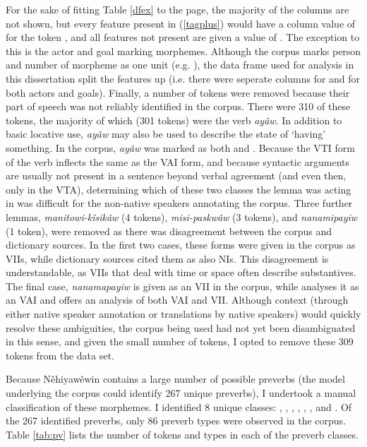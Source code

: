 For the sake of fitting Table \ref{dfex} to the page, the majority of the columns are not shown, but every feature present in (\ref{tagplus}) would have a column value of  for the token , and all features not present are given a value of . The exception to this is the actor and goal marking morphemes. Although the corpus marks person and number of morpheme as one unit (e.g. ), the data frame used for analysis in this dissertation split the features up (i.e. there were seperate columns for  and  for both actors and goals). Finally, a number of tokens were removed because their part of speech was not reliably identified in the corpus. There were 310 of these tokens, the majority of which (301 tokens) were the verb \textit{ayâw}. In addition to basic locative use, \textit{ayâw} may also be used to describe the state of `having' something. In the corpus, \textit{ayâw} was marked as both  and . Because the VTI form of the verb inflects the same as the VAI form, and because syntactic arguments are usually not present in a sentence beyond verbal agreement (and even then, only in the VTA), determining which of these two classes the lemma was acting in was difficult for the non-native speakers annotating the corpus. Three further lemmas, \textit{manitowi-kîsikâw} (4 tokens), \textit{misi-paskwâw} (3 tokens), and \textit{nanamipayiw} (1 token), were removed as there was disagreement between the corpus and dictionary sources. In the first two cases, these forms were given in the corpus as VIIs, while dictionary sources cited them as also NIs. This disagreement is understandable, as VIIs that deal with time or space often describe substantives. The final case, \textit{nanamapayiw} is given as an VII in the corpus, while \citet{Wolvengrey2001} analyses it as an VAI and \citet{leclaire1998alberta} offers an analysis of both VAI and VII. Although context (through either native speaker annotation or translations by native speakers) would quickly resolve these ambiguities, the corpus being used had not yet been disambiguated in this sense, and given the small number of tokens, I opted to remove these 309 tokens from the data set. 

Because Nêhiyawêwin contains a large number of possible preverbs (the model underlying the corpus could identify 267 unique preverbs), I undertook a manual classification of these morphemes. I identified 8 unique classes: , , , , , ,  and . Of the 267 identified preverbs, only 86 preverb types were observed in the corpus. Table \ref{tab:pv} lists the number of tokens and types in each of the preverb classes.

